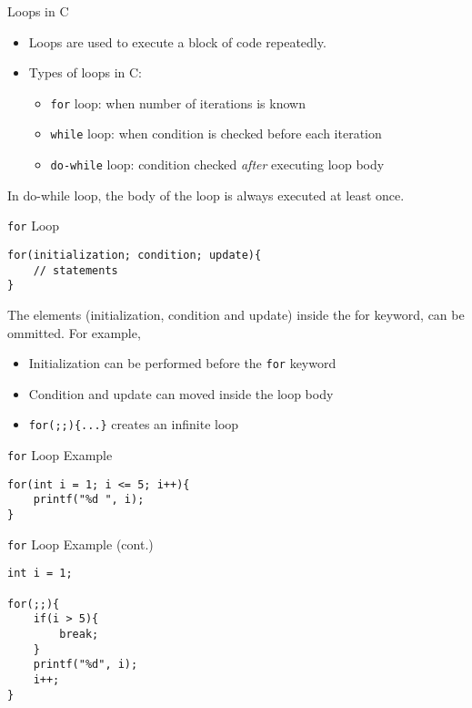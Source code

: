 \documentclass[12pt, aspectratio=169]{beamer}
\begin{document}
    \begin{frame}{Loops in C}
        \begin{itemize}
            \item Loops are used to execute a block of code repeatedly.
            \item Types of loops in C:
            \begin{itemize}
                \item \texttt{for} loop: when number of iterations is known
                \item \texttt{while} loop: when condition is checked before each iteration
                \item \texttt{do-while} loop: condition checked \textit{after} executing loop body
            \end{itemize}
        \end{itemize}

        In do-while loop, the body of the loop is always executed at least once.
    \end{frame}


    \begin{frame}[fragile]{\texttt{for} Loop}
\begin{verbatim}
for(initialization; condition; update){
    // statements
}
        \end{verbatim}

        The elements (initialization, condition and update) inside the for keyword, can be ommitted. For example,
        \begin{itemize}
            \item Initialization can be performed before the \texttt{for} keyword
            \item Condition and update can moved inside the loop body
            \item \texttt{for(;;)\{...\}} creates an infinite loop
        \end{itemize}
    \end{frame}


    \begin{frame}[fragile]{\texttt{for} Loop Example}
        \begin{verbatim}
for(int i = 1; i <= 5; i++){
    printf("%d ", i);
}
        \end{verbatim}
    \end{frame}


        \begin{frame}[fragile]{\texttt{for} Loop Example (cont.)}
        \begin{verbatim}
int i = 1;

for(;;){
    if(i > 5){
        break;
    }
    printf("%d", i);
    i++;
}
        \end{verbatim}
    \end{frame}
\end{document}
